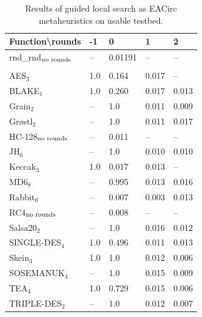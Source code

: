 \documentclass[
  print, %
  Table,   %
  nolof,     %
  nolot,     %
  11pt, %
  oneside  %
]{fithesis3}
\newcommand{\fd}{\cellcolor{myred!15}}
\newcommand{\fn}{\cellcolor{mygreen!20}}
\begin{document}
\begin{table}[H]
\centering
\begin{tabular}{l|l l l l}
Function\textbackslash{}rounds & -1 & 0 & 1 & 2\\ \hline
rnd\_rnd$_{\textnormal{no rounds}}$ & -- & \fn{}0.01191& --  & --   \\\\
AES$_{3}$        & \fd{}1.0   & \fd{}0.164 & \fn{}0.017 & \fn{}--   \\
BLAKE$_{1}$      & \fd{}1.0   & \fd{}0.260 & \fn{}0.017 & \fn{}0.013\\
Grain$_{2}$      & \fd{}--    & \fd{}1.0   & \fn{}0.011 & \fn{}0.009\\
Gr\o stl$_{2}$   & \fd{}--    & \fd{}1.0   & \fn{}0.011 & \fn{}0.017\\
HC-128$_{\textnormal{no rounds}}$& -- & \fn{}0.011 & -- & --        \\
JH$_{6}$         & \fd{}--    & \fd{}1.0   & \fn{}0.010 & \fn{}0.010\\
Keccak$_{3}$     & \fd{}1.0   & \fn{}0.017 & \fn{}0.013 & \fn{}--   \\
MD6$_{8}$        & \fd{}--    & \fd{}0.995 & \fn{}0.013 & \fn{}0.016\\
Rabbit$_{0}$     &      --    & \fn{}0.007 & \fn{}0.003 & \fn{}0.013\\
RC4$_{\textnormal{no rounds}}$& -- & \fn{}0.008 & --    & --        \\
Salsa20$_{2}$    & \fd{}--    & \fd{}1.0   & \fn{}0.016 & \fn{}0.012\\
SINGLE-DES$_{4}$ & \fd{}1.0   & \fd{}0.496 & \fn{}0.011 & \fn{}0.013\\
Skein$_{3}$      & \fd{}1.0   & \fd{}1.0   & \fn{}0.012 & \fn{}0.006\\
SOSEMANUK$_{4}$  & \fd{}--    & \fd{}1.0   & \fn{}0.015 & \fn{}0.009\\
TEA$_{4}$        & \fd{}1.0   & \fd{}0.729 & \fn{}0.015 & \fn{}0.006\\
TRIPLE-DES$_{2}$ & \fd{}--    & \fd{}1.0   & \fn{}0.012 & \fn{}0.007
\end{tabular}
\caption{Results of guided local search as EACirc metaheuristics on usable testbed.}
\label{table:res-usable-gls}
\end{table}
\end{document}

